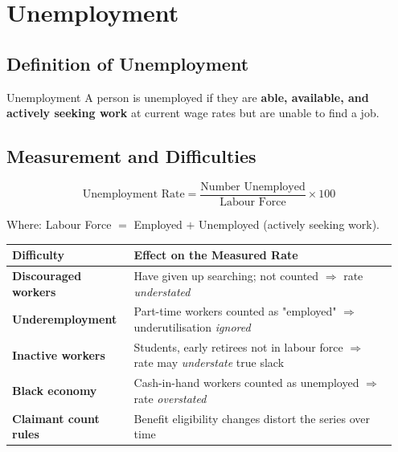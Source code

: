 \documentclass[11pt, a4paper, twoside]{book}
\begin{document}
\section{Unemployment}

\subsection{Definition of Unemployment}

\begin{keyterm}{Unemployment}
A person is unemployed if they are \textbf{able, available, and actively seeking work} at current wage rates but are unable to find a job.
\end{keyterm}

\subsection{Measurement and Difficulties}

\[
\text{Unemployment Rate} = \frac{\text{Number Unemployed}}{\text{Labour Force}} \times 100
\]

Where: Labour Force $=$ Employed $+$ Unemployed (actively seeking work).

\begin{tcolorbox}[enhanced,colback=LightBlue,colframe=MidBlue!70,arc=0pt,boxrule=0.8pt]
\begin{tabular}{@{}>{\RaggedRight\arraybackslash}p{0.30\linewidth}>{\RaggedRight\arraybackslash}p{0.65\linewidth}@{}}
\textbf{\color{NavyPrimary}Difficulty} & \textbf{\color{NavyPrimary}Effect on the Measured Rate} \\
\midrule
\textbf{Discouraged workers} & Have given up searching; not counted $\Rightarrow$ rate \emph{understated} \\
\textbf{Underemployment} & Part-time workers counted as "employed" $\Rightarrow$ underutilisation \emph{ignored} \\
\textbf{Inactive workers} & Students, early retirees not in labour force $\Rightarrow$ rate may \emph{understate} true slack \\
\textbf{Black economy} & Cash-in-hand workers counted as unemployed $\Rightarrow$ rate \emph{overstated} \\
\textbf{Claimant count rules} & Benefit eligibility changes distort the series over time \\
\end{tabular}
\end{tcolorbox}
\end{document}

